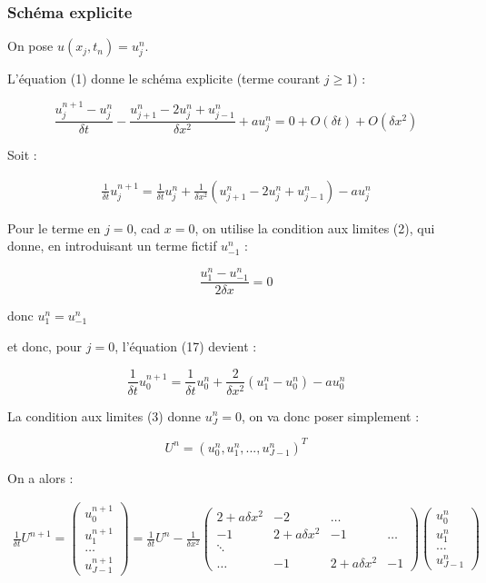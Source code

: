 \documentclass[french]{article}
\begin{document}
\subsubsection{Schéma explicite}

On pose $ u(x_{j},t_{n}) = u_{j}^{n} $.

L'équation (1) donne le schéma explicite (terme courant $ j \geq 1 $) :

\[
\frac{u_{j}^{n+1}-u_{j}^{n}}{\delta t}-\frac{u_{j+1}^{n}-2u_{j}^{n}+u_{j-1}^{n}}{\delta x^{2}}+au_{j}^{n}=0+O(\delta t)+O(\delta x^{2})
\]

Soit :

\begin{align}
\frac{1}{\delta t}u_{j}^{n+1}=\frac{1}{\delta t}u_{j}^{n}+
\frac{1}{\delta x^{2}}\left(u_{j+1}^{n}-2u_{j}^{n}+u_{j-1}^{n} \right)-au_{j}^{n}
\end{align}

Pour le terme en $ j=0 $, cad $ x=0 $, on utilise la condition aux limites (2), qui donne, en introduisant un terme fictif $ u_{-1}^{n} $ :

\[
\frac{u_{1}^{n}-u_{-1}^{n}}{2 \delta x} = 0
\]

donc $ u_{1}^{n} = u_{-1}^{n} $

et donc, pour $ j=0 $, l'équation (17) devient :

\[
\frac{1}{\delta t}u_{0}^{n+1}=\frac{1}{\delta t}u_{0}^{n}+
\frac{2}{\delta x^{2}}\left(u_{1}^{n}-u_{0}^{n} \right)-au_{0}^{n}
\]

La condition aux limites (3) donne $ u_{J}^{n}=0 $, on va donc poser simplement :

\[
U^{n}=(u_{0}^{n}, u_{1}^{n}, ... ,u_{J-1}^{n})^{T}
\]

On a alors :

\begin{align}
\frac{1}{\delta t}U^{n+1}=
\begin{pmatrix}
u_{0}^{n+1} \\ u_{1}^{n+1} \\ \hdots \\ u_{J-1}^{n+1}
\end{pmatrix} =
\frac{1}{\delta t}U^{n}
- \frac{1}{\delta x^{2}}
\begin{pmatrix}
2+a\delta x^{2} & -2 & \hdots \\
-1 & 2+a\delta x^{2} & -1 & \hdots \\
\ddots \\
\hdots & -1 & 2+a\delta x^{2} & -1 
\end{pmatrix}
\begin{pmatrix}
u_{0}^{n} \\ u_{1}^{n} \\ \hdots \\ u_{J-1}^{n}
\end{pmatrix}
\end{align}
\end{document}
